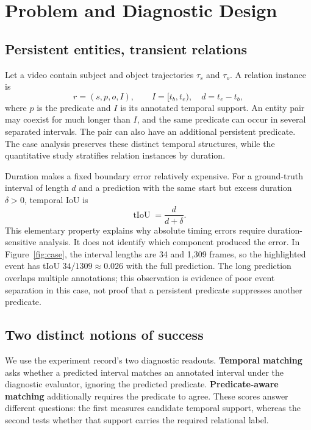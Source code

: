 \documentclass[10pt,twocolumn,letterpaper]{article}
\begin{document}
\section{Problem and Diagnostic Design}
\subsection{Persistent entities, transient relations}
Let a video contain subject and object trajectories $\tau_s$ and $\tau_o$. A relation instance is
\begin{equation}
 r=(s,p,o,I),\qquad I=[t_b,t_e),\quad d=t_e-t_b,
\end{equation}
where $p$ is the predicate and $I$ is its annotated temporal support. An entity pair may coexist for much longer than $I$, and the same predicate can occur in several separated intervals. The pair can also have an additional persistent predicate. The case analysis preserves these distinct temporal structures, while the quantitative study stratifies relation instances by duration.

Duration makes a fixed boundary error relatively expensive. For a ground-truth interval of length $d$ and a prediction with the same start but excess duration $\delta>0$, temporal IoU is
\begin{equation}
 \operatorname{tIoU}=\frac{d}{d+\delta}.
 \label{eq:stretch}
\end{equation}
This elementary property explains why absolute timing errors require duration-sensitive analysis. It does not identify which component produced the error. In Figure~\ref{fig:case}, the interval lengths are 34 and 1,309 frames, so the highlighted event has tIoU $34/1309\approx0.026$ with the full prediction. The long prediction overlaps multiple annotations; this observation is evidence of poor event separation in this case, not proof that a persistent predicate suppresses another predicate.

\subsection{Two distinct notions of success}
We use the experiment record's two diagnostic readouts. \textbf{Temporal matching} asks whether a predicted interval matches an annotated interval under the diagnostic evaluator, ignoring the predicted predicate. \textbf{Predicate-aware matching} additionally requires the predicate to agree. These scores answer different questions: the first measures candidate temporal support, whereas the second tests whether that support carries the required relational label.
\end{document}
